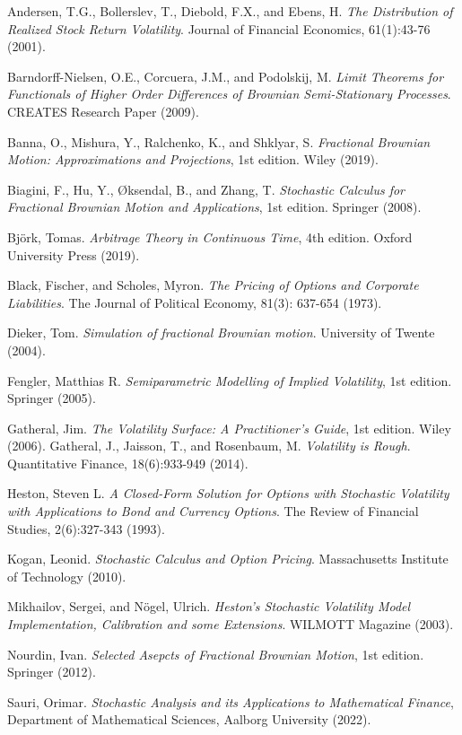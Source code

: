 \documentclass[11pt,a4paper,twoside,openright,english]{book}
\begin{document}
%
%
\begin{thebibliography}{}
Andersen, T.G., Bollerslev, T., Diebold, F.X., and Ebens, H. \textit{The Distribution of Realized Stock Return Volatility}. Journal of Financial Economics, 61(1):43-76 (2001).

Barndorff-Nielsen, O.E., Corcuera, J.M., and Podolskij, M. \textit{Limit Theorems for Functionals of Higher Order Differences of Brownian Semi-Stationary Processes}. CREATES Research Paper (2009).

Banna, O., Mishura, Y., Ralchenko, K., and Shklyar, S. \textit{Fractional Brownian Motion: Approximations and Projections}, 1st edition. Wiley (2019).

Biagini, F., Hu, Y., Øksendal, B., and Zhang, T. \textit{Stochastic Calculus for Fractional Brownian Motion and Applications}, 1st edition. Springer (2008).

Björk, Tomas. \textit{Arbitrage Theory in Continuous Time}, 4th edition. Oxford University Press (2019).

Black, Fischer, and Scholes, Myron. \textit{The Pricing of Options and Corporate Liabilities}. The Journal of Political Economy, 81(3): 637-654 (1973).

Dieker, Tom. \textit{Simulation of fractional Brownian motion}. University of Twente (2004).

Fengler, Matthias R. \textit{Semiparametric Modelling of Implied Volatility}, 1st edition. Springer (2005).

Gatheral, Jim. \textit{The Volatility Surface: A Practitioner's Guide}, 1st edition. Wiley (2006).
Gatheral, J., Jaisson, T., and Rosenbaum, M. \textit{Volatility is Rough}. Quantitative Finance, 18(6):933-949 (2014).

Heston, Steven L. \textit{A Closed-Form Solution for Options with Stochastic Volatility with Applications to Bond and Currency Options}. The Review of Financial Studies, 2(6):327-343 (1993).

Kogan, Leonid. \textit{Stochastic Calculus and Option Pricing}. Massachusetts Institute of Technology (2010).

Mikhailov, Sergei, and Nögel, Ulrich. \textit{Heston's Stochastic Volatility Model Implementation, Calibration and some Extensions}. WILMOTT Magazine (2003).

Nourdin, Ivan. \textit{Selected Asepcts of Fractional Brownian Motion}, 1st edition. Springer (2012).

Sauri, Orimar. \textit{Stochastic Analysis and its Applications to Mathematical Finance}, Department of Mathematical Sciences, Aalborg University (2022).
\end{thebibliography}{}
\end{document}
